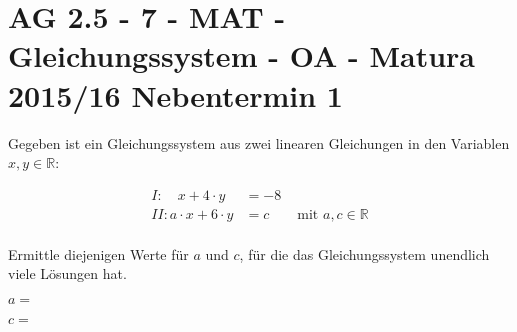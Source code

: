 \section{AG 2.5 - 7 - MAT - Gleichungssystem - OA - Matura 2015/16 Nebentermin 1}

\begin{beispiel}[AG 2.5]{1} %
Gegeben ist ein Gleichungssystem aus zwei linearen Gleichungen in den Variablen $x,y \in \mathbb{R}$:

\begin{align*}
I: \quad x+4\cdot y &= -8 \\
II: a\cdot x +6 \cdot y &= c \qquad \text{mit }a,c \in \mathbb{R} \\
\end{align*}


Ermittle diejenigen Werte für $a$ und $c$, für die das Gleichungssystem unendlich viele Lösungen hat. \leer

$a=$ \leer

$c=$ 		
\end{beispiel}